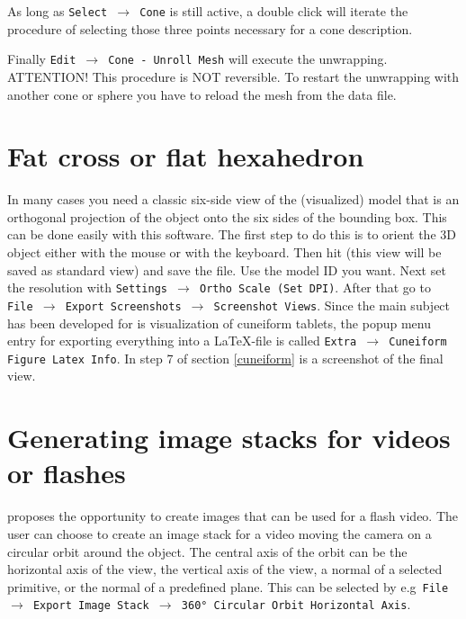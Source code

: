 As long as {\tt Select $\rightarrow$ Cone} is still active, a double click will iterate the procedure of selecting those three points necessary for a cone description.

Finally {\tt Edit $\rightarrow$ Cone - Unroll Mesh} will execute the unwrapping. ATTENTION! This procedure is NOT reversible. To restart the unwrapping with another cone or sphere you have to reload the mesh from the data file.


\section{Fat cross or flat hexahedron}
In many cases you need a classic six-side view of the (visualized) model that is an orthogonal projection of the object onto the six sides of the bounding box. This can be done easily with this software. The first step to do this is to orient the 3D object either with the mouse or with the keyboard. Then hit \! (this view will be saved as standard view) and save the file. Use the model ID you want. Next set the resolution with \texttt{Settings $\rightarrow$ Ortho Scale (Set DPI)}. After that go to \texttt{File  $\rightarrow$ Export Screenshots $\rightarrow$ Screenshot Views}. Since the main subject \GigaMesh has been developed for is visualization of cuneiform tablets, the popup menu entry for exporting  everything into a \LaTeX-file is called \texttt{Extra $\rightarrow$ Cuneiform Figure Latex Info}. In  step 7 of  section \ref{cuneiform} is a screenshot of the final view.


\section{Generating image stacks for videos or flashes}
\GigaMesh proposes the opportunity to create images that can be used for a flash video. The user can choose to create an image stack for a video moving the camera on a circular orbit around the object. The central axis of the orbit can be the horizontal axis of the view, the vertical axis of the view, a normal of a selected primitive, or the normal of a predefined plane.  This can be selected by  e.g~\texttt{File $\rightarrow$ Export Image Stack $\rightarrow$ 360° Circular Orbit Horizontal Axis}.

